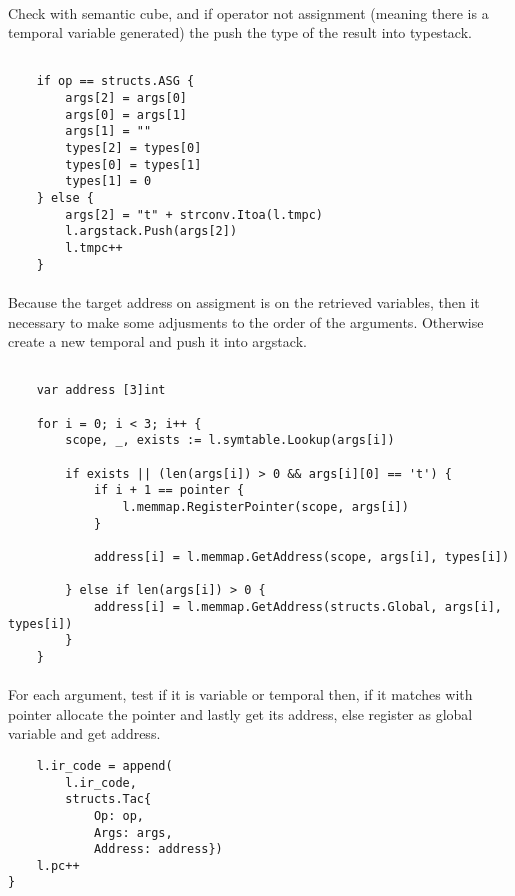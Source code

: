\paragraph{} Check with semantic cube, and if operator not assignment (meaning
there is a temporal variable generated) the push the type of the result into
typestack.

\begin{verbatim}

    if op == structs.ASG {
        args[2] = args[0]
        args[0] = args[1]
        args[1] = ""
        types[2] = types[0]
        types[0] = types[1]
        types[1] = 0
    } else {
        args[2] = "t" + strconv.Itoa(l.tmpc)
        l.argstack.Push(args[2])
        l.tmpc++
    }
\end{verbatim}

\paragraph{} Because the target address on assigment is on the retrieved
variables, then it necessary to make some adjusments to the order of the
arguments. Otherwise create a new temporal and push it into argstack.

\newpage

\begin{verbatim}

    var address [3]int

    for i = 0; i < 3; i++ {
        scope, _, exists := l.symtable.Lookup(args[i])

        if exists || (len(args[i]) > 0 && args[i][0] == 't') {
            if i + 1 == pointer {
                l.memmap.RegisterPointer(scope, args[i])
            }

            address[i] = l.memmap.GetAddress(scope, args[i], types[i])

        } else if len(args[i]) > 0 {
            address[i] = l.memmap.GetAddress(structs.Global, args[i], types[i])
        }
    }
\end{verbatim}

\paragraph{} For each argument, test if it is variable or temporal then,
if it matches with pointer allocate the pointer and lastly get its address,
else register as global variable and get address.

\begin{verbatim}
    l.ir_code = append(
        l.ir_code,
        structs.Tac{
            Op: op,
            Args: args,
            Address: address})
    l.pc++
}
\end{verbatim}

